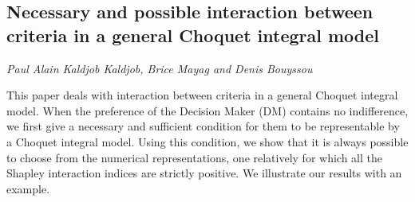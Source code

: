 \documentclass[../booklet.tex]{subfiles}
\begin{document}
\subsection[Necessary and possible interaction between criteria in a general Choquet integral model. {\it Paul Alain Kaldjob Kaldjob, Brice Mayag and Denis Bouyssou}]{Necessary and possible interaction between criteria in a general Choquet integral model}
  

\begin{center}
  {\it Paul Alain Kaldjob Kaldjob, Brice Mayag and Denis Bouyssou}
\end{center}



 This paper deals with interaction  between criteria in a
general Choquet integral model. When the preference of the Decision
Maker (DM) contains no indifference, we first give a necessary and
sufficient condition for them to be representable by a Choquet
integral model. Using this condition, we show that it is always
possible to choose from the numerical representations, one
relatively for which all the Shapley interaction indices are strictly
positive. We illustrate our results with an example.

\end{document}
